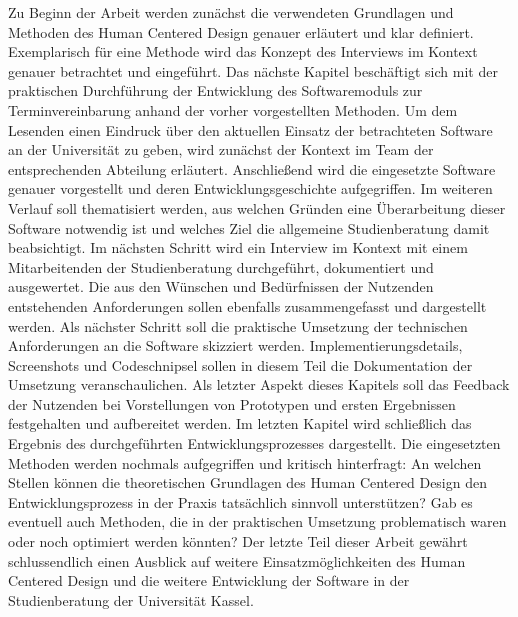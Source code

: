 Zu Beginn der Arbeit werden zunächst die verwendeten Grundlagen und Methoden
des Human Centered Design genauer erläutert und klar definiert. Exemplarisch
für eine Methode wird das Konzept des Interviews im Kontext genauer betrachtet
und eingeführt. Das nächste Kapitel beschäftigt sich mit der praktischen
Durchführung der Entwicklung des Softwaremoduls zur Terminvereinbarung anhand
der vorher vorgestellten Methoden. Um dem Lesenden einen Eindruck über den
aktuellen Einsatz der betrachteten Software an der Universität zu geben, wird
zunächst der Kontext im Team der entsprechenden Abteilung erläutert.
Anschließend wird die eingesetzte Software genauer vorgestellt und deren
Entwicklungsgeschichte aufgegriffen. Im weiteren Verlauf soll thematisiert
werden, aus welchen Gründen eine Überarbeitung dieser Software notwendig ist
und welches Ziel die allgemeine Studienberatung damit beabsichtigt. Im nächsten
Schritt wird ein Interview im Kontext mit einem Mitarbeitenden der
Studienberatung durchgeführt, dokumentiert und ausgewertet. Die aus den
Wünschen und Bedürfnissen der Nutzenden entstehenden Anforderungen sollen
ebenfalls zusammengefasst und dargestellt werden. Als nächster Schritt soll die
praktische Umsetzung der technischen Anforderungen an die Software skizziert
werden. Implementierungsdetails, Screenshots und Codeschnipsel sollen in diesem
Teil die Dokumentation der Umsetzung veranschaulichen. Als letzter Aspekt
dieses Kapitels soll das Feedback der Nutzenden bei Vorstellungen von
Prototypen und ersten Ergebnissen festgehalten und aufbereitet werden. Im
letzten Kapitel wird schließlich das Ergebnis des durchgeführten
Entwicklungsprozesses dargestellt. Die eingesetzten Methoden werden nochmals
aufgegriffen und kritisch hinterfragt: An welchen Stellen können die
theoretischen Grundlagen des Human Centered Design den Entwicklungsprozess in
der Praxis tatsächlich sinnvoll unterstützen? Gab es eventuell auch Methoden,
die in der praktischen Umsetzung problematisch waren oder noch optimiert werden
könnten? Der letzte Teil dieser Arbeit gewährt schlussendlich einen Ausblick
auf weitere Einsatzmöglichkeiten des Human Centered Design und die weitere
Entwicklung der Software in der Studienberatung der Universität Kassel.


